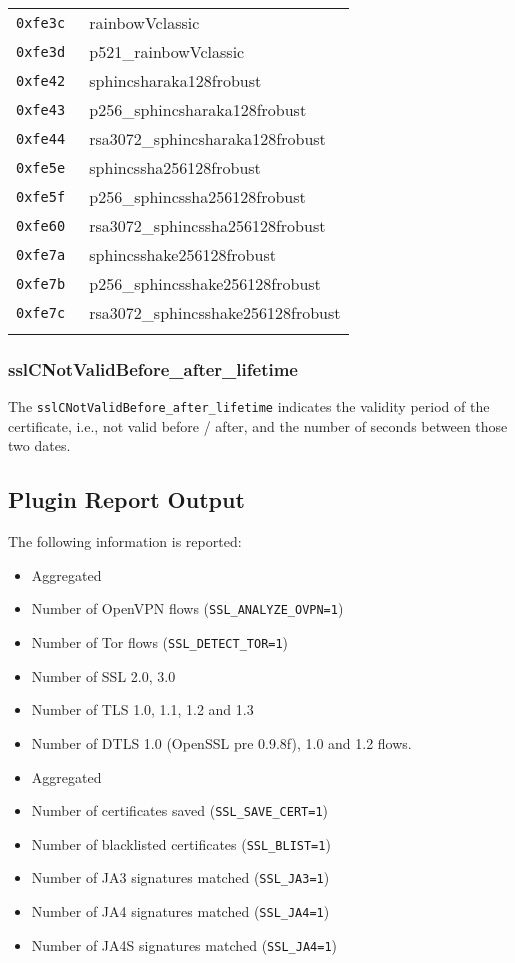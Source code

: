 \documentclass[documentation]{subfiles}
\begin{document}
\begin{minipage}{.48\textwidth}
\begin{longtable}{>{\tt}rl}
        0xfe3c & rainbowVclassic\\
        0xfe3d & p521\_rainbowVclassic\\
        0xfe42 & sphincsharaka128frobust\\
        0xfe43 & p256\_sphincsharaka128frobust\\
        0xfe44 & rsa3072\_sphincsharaka128frobust\\
        0xfe5e & sphincssha256128frobust\\
        0xfe5f & p256\_sphincssha256128frobust\\
        0xfe60 & rsa3072\_sphincssha256128frobust\\
        0xfe7a & sphincsshake256128frobust\\
        0xfe7b & p256\_sphincsshake256128frobust\\
        0xfe7c & rsa3072\_sphincsshake256128frobust\\
               & \\
        \bottomrule
    \end{longtable}
\end{minipage}

\subsubsection{sslCNotValidBefore\_after\_lifetime}\label{sslValidity}
The {\tt sslCNotValidBefore\_after\_lifetime} indicates the validity period of the certificate, i.e., not valid before / after, and the number of seconds between those two dates.

\subsection{Plugin Report Output}
The following information is reported:
\begin{itemize}
    \item Aggregated {\tt{}}
    \item Number of OpenVPN flows ({\tt SSL\_ANALYZE\_OVPN=1})
    \item Number of Tor flows ({\tt SSL\_DETECT\_TOR=1})
    \item Number of SSL 2.0, 3.0
    \item Number of TLS 1.0, 1.1, 1.2 and 1.3
    \item Number of DTLS 1.0 (OpenSSL pre 0.9.8f), 1.0 and 1.2 flows.
    \item Aggregated {\tt{}}
    \item Number of certificates saved ({\tt SSL\_SAVE\_CERT=1})
    \item Number of blacklisted certificates ({\tt SSL\_BLIST=1})
    \item Number of JA3 signatures matched ({\tt SSL\_JA3=1})
    \item Number of JA4 signatures matched ({\tt SSL\_JA4=1})
    \item Number of JA4S signatures matched ({\tt SSL\_JA4=1})
\end{itemize}

\end{document}

